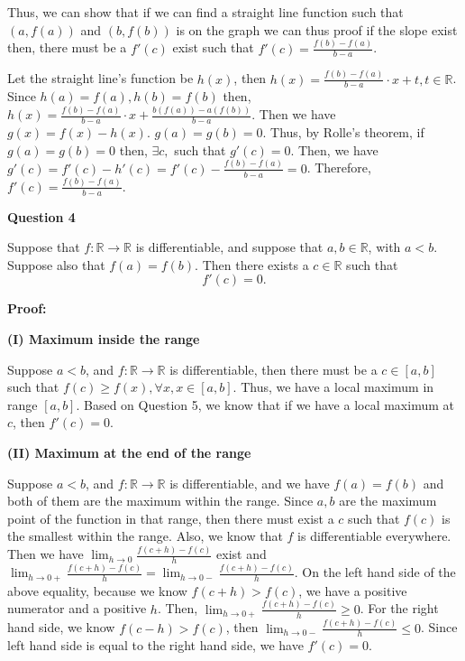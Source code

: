\documentclass[a4paper,12pt]{report}
\newcommand{\R}{\mathbb{R}}
\begin{document}
\noindent
Thus, we can show that if we can find a straight line function such that $(a,f(a))$ and $(b,f(b))$ is on the graph we can thus proof if the slope exist then, there must be a $f'(c)$ exist such that $f'(c)=\frac{f(b)-f(a)}{b-a}$.

\noindent
Let the straight line's function be $h(x)$, then $h(x)=\frac{f(b)-f(a)}{b-a}\cdot{x}+t, t\in \mathbb{R}$. Since $h(a)=f(a),h(b)=f(b)$ then, $h(x)=\frac{f(b)-f(a)}{b-a}\cdot{x}+\frac{b(f(a))-a(f(b))}{b-a}$. Then we have $g(x)=f(x)-h(x)$. $g(a)=g(b)=0$. Thus, by Rolle's theorem, if $g(a)=g(b)=0$ then, $\exists c,$ such that $g'(c)=0$. Then, we have $g'(c)=f'(c)-h'(c)=f'(c)-\frac{f(b)-f(a)}{b-a}=0$. Therefore,$f'(c)=\frac{f(b)-f(a)}{b-a}$. 

\pagebreak
\noindent
\textbf{Question 4}

\noindent
Suppose that $f:\R\to\R$ is
differentiable, and suppose that $a,b\in\R$, 
with $a<b$. Suppose also 
that $f(a)=f(b)$. Then there exists a $c\in\R$
such that
\[
f'(c)=0.
\]

\noindent
\textbf{Proof: }

\noindent
\textbf{(I) Maximum inside the range} 

\noindent
Suppose $a<b$, and $f:\R\to\R$ is differentiable, then there must be a $c\in [a,b]$ such that $f(c)\geq f(x),\forall x, x\in [a,b]$. Thus, we have a local maximum in range $[a,b]$. Based on Question 5, we know that if we have a local maximum at $c$, then $f'(c)=0$.

\noindent
\textbf{(II) Maximum at the end of the range}

\noindent
Suppose $a<b$, and $f:\R\to\R$ is differentiable, and we have $f(a)=f(b)$ and both of them are the maximum within the range. Since $a,b$ are the maximum point of the function in that range, then there must exist a $c$ such that $f(c)$ is the smallest within the range. Also, we know that $f$ is differentiable everywhere. Then we have $\displaystyle{\lim_{h\to 0}}\frac{f(c+h)-f(c)}{h}$ exist and $\displaystyle{\lim_{h\to 0+}}\frac{f(c+h)-f(c)}{h}=\displaystyle{\lim_{h\to 0-}}\frac{f(c+h)-f(c)}{h}$. On the left hand side of the above equality, because we know $f(c+h)>f(c)$, we have a positive numerator and a positive $h$. Then, $\displaystyle{\lim_{h\to 0+}}\frac{f(c+h)-f(c)}{h}\geq 0$. For the right hand side, we know $f(c-h)>f(c)$, then $\displaystyle{\lim_{h\to 0-}}\frac{f(c+h)-f(c)}{h}\leq 0$. Since left hand side is equal to the right hand side, we have $f'(c)=0$.\\
\end{document}

